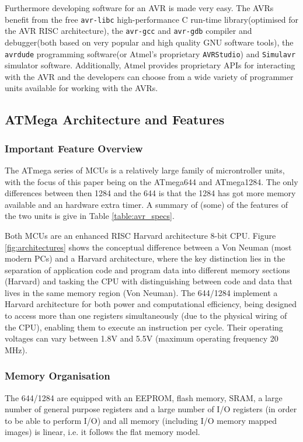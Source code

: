 \documentclass[10pt,a4paper,twocolumn]{article}
\begin{document}
	Furthermore developing software for an AVR is made very easy. The AVRs benefit from the free \texttt{avr-libc} high-performance C run-time library(optimised for the AVR RISC architecture), the \texttt{avr-gcc} and \texttt{avr-gdb} compiler and debugger(both based on very popular and high quality GNU software tools), the \texttt{avrdude} programming software(or Atmel's proprietary \texttt{AVRStudio}) and \texttt{Simulavr} simulator software. Additionally, Atmel provides proprietary APIs for interacting with the AVR and the developers can choose from a wide variety of programmer units available for working with the AVRs\cite{book:practical_avr}.
	
	\subsection{ATMega Architecture and Features}				

	\subsubsection{Important Feature Overview}
	The ATmega series of MCUs is a relatively large family of microntroller units, with the focus of this paper being on the ATmega644 and ATmega1284. The only differences between then 1284 and the 644 is that the 1284 has got more memory available and an hardware extra timer. A summary of (some) of the features of the two units is give in Table \ref{table:avr_specs}\citep{atmega_manual}. 
	
	Both MCUs are an enhanced RISC Harvard architecture 8-bit CPU. Figure \ref{fig:architectures} shows the conceptual difference between a Von Neuman (most modern PCs) and a Harvard architecture, where the key distinction lies in the separation of application code and program data into different memory sections (Harvard) and tasking the CPU with distinguishing between code and data that lives in the same memory region (Von Neuman). The 644/1284 implement a Harvard architecture for both power and computational efficiency, being designed to access more than one registers simultaneously (due to the physical wiring of the CPU), enabling them to execute an instruction per cycle. Their operating voltages can vary between 1.8V and 5.5V (maximum operating frequency 20 MHz).
	
	\subsubsection{Memory Organisation}
	The 644/1284 are equipped with an EEPROM, flash memory, SRAM, a large number of general purpose registers and a large number of I/O registers (in order to be able to perform I/O) and all memory (including I/O memory mapped images) is linear, i.e. it follows the flat memory model.
	
\end{document}
